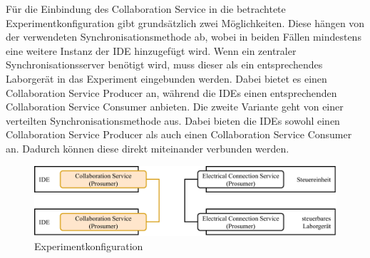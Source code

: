 Für die Einbindung des Collaboration Service in die betrachtete Experimentkonfiguration gibt grundsätzlich zwei Möglichkeiten. Diese hängen von der verwendeten Synchronisationsmethode ab, wobei in beiden Fällen mindestens eine weitere Instanz der IDE hinzugefügt wird. Wenn ein zentraler Synchronisationsserver benötigt wird, muss dieser als ein entsprechendes Laborgerät in das Experiment eingebunden werden. Dabei bietet es einen Collaboration Service Producer an, während die IDEs einen entsprechenden Collaboration Service Consumer anbieten. Die zweite Variante geht von einer verteilten Synchronisationsmethode aus. Dabei bieten die IDEs sowohl einen Collaboration Service Producer als auch einen Collaboration Service Consumer an. Dadurch können diese direkt miteinander verbunden werden.

\begin{figure}[htbp]
    \centering
    \includegraphics[width=\textwidth]{diagrams/experimentkonfigurationen/Experimentkonfiguration-01.drawio.pdf}
    \caption{Experimentkonfiguration}
    \label{figure:experimentkonfiguration:kollaboration}
\end{figure}
